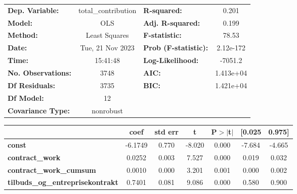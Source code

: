 \begin{center}
\begin{tabular}{lclc}
\toprule
\textbf{Dep. Variable:}                   & total\_contribution & \textbf{  R-squared:         } &     0.201   \\
\textbf{Model:}                           &         OLS         & \textbf{  Adj. R-squared:    } &     0.199   \\
\textbf{Method:}                          &    Least Squares    & \textbf{  F-statistic:       } &     78.53   \\
\textbf{Date:}                            &   Tue, 21 Nov 2023  & \textbf{  Prob (F-statistic):} & 2.12e-172   \\
\textbf{Time:}                            &       15:41:48      & \textbf{  Log-Likelihood:    } &   -7051.2   \\
\textbf{No. Observations:}                &          3748       & \textbf{  AIC:               } & 1.413e+04   \\
\textbf{Df Residuals:}                    &          3735       & \textbf{  BIC:               } & 1.421e+04   \\
\textbf{Df Model:}                        &            12       & \textbf{                     } &             \\
\textbf{Covariance Type:}                 &      nonrobust      & \textbf{                     } &             \\
\bottomrule
\end{tabular}
\begin{tabular}{lcccccc}
                                          & \textbf{coef} & \textbf{std err} & \textbf{t} & \textbf{P$> |$t$|$} & \textbf{[0.025} & \textbf{0.975]}  \\
\midrule
\textbf{const}                            &      -6.1749  &        0.770     &    -8.020  &         0.000        &       -7.684    &       -4.665     \\
\textbf{contract\_work}                   &       0.0252  &        0.003     &     7.527  &         0.000        &        0.019    &        0.032     \\
\textbf{contract\_work\_cumsum}           &       0.0010  &        0.000     &     3.201  &         0.001        &        0.000    &        0.002     \\
\textbf{tilbuds\_og\_entreprisekontrakt}  &       0.7401  &        0.081     &     9.086  &         0.000        &        0.580    &        0.900     \\

\end{tabular}
\end{center}
